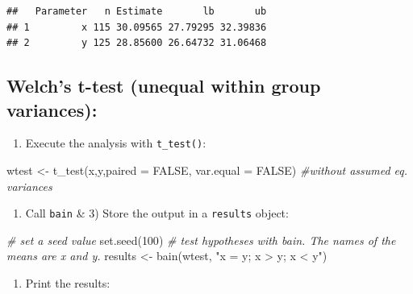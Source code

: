 \documentclass[
]{book}
\newenvironment{Shaded}{\begin{snugshade}}{\end{snugshade}}
\newcommand{\AttributeTok}[1]{\textcolor[rgb]{0.77,0.63,0.00}{#1}}
\newcommand{\CommentTok}[1]{\textcolor[rgb]{0.56,0.35,0.01}{\textit{#1}}}
\newcommand{\ConstantTok}[1]{\textcolor[rgb]{0.00,0.00,0.00}{#1}}
\newcommand{\DecValTok}[1]{\textcolor[rgb]{0.00,0.00,0.81}{#1}}
\newcommand{\FunctionTok}[1]{\textcolor[rgb]{0.00,0.00,0.00}{#1}}
\newcommand{\NormalTok}[1]{#1}
\newcommand{\OtherTok}[1]{\textcolor[rgb]{0.56,0.35,0.01}{#1}}
\newcommand{\StringTok}[1]{\textcolor[rgb]{0.31,0.60,0.02}{#1}}
\providecommand{\tightlist}{%
  \setlength{\itemsep}{0pt}\setlength{\parskip}{0pt}}
\begin{document}
\begin{verbatim}
##   Parameter   n Estimate       lb       ub
## 1         x 115 30.09565 27.79295 32.39836
## 2         y 125 28.85600 26.64732 31.06468
\end{verbatim}

\hypertarget{welchs-t-test-unequal-within-group-variances}{%
\subsection{Welch's t-test (unequal within group variances):}\label{welchs-t-test-unequal-within-group-variances}}

\begin{enumerate}
\def\labelenumi{\arabic{enumi})}
\tightlist
\item
  Execute the analysis with \texttt{t\_test()}:
\end{enumerate}

\begin{Shaded}
\begin{Highlighting}[]
\NormalTok{wtest }\OtherTok{\textless{}{-}} \FunctionTok{t\_test}\NormalTok{(x,y,}\AttributeTok{paired =} \ConstantTok{FALSE}\NormalTok{, }\AttributeTok{var.equal =} \ConstantTok{FALSE}\NormalTok{) }\CommentTok{\#without assumed eq. variances}
\end{Highlighting}
\end{Shaded}

\begin{enumerate}
\def\labelenumi{\arabic{enumi})}
\setcounter{enumi}{1}
\tightlist
\item
  Call \texttt{bain} \& 3) Store the output in a \texttt{results} object:
\end{enumerate}

\begin{Shaded}
\begin{Highlighting}[]
\CommentTok{\# set a seed value}
\FunctionTok{set.seed}\NormalTok{(}\DecValTok{100}\NormalTok{)}
\CommentTok{\# test hypotheses with bain. The names of the means are x and y.}
\NormalTok{results }\OtherTok{\textless{}{-}} \FunctionTok{bain}\NormalTok{(wtest, }\StringTok{"x = y; x \textgreater{} y; x \textless{} y"}\NormalTok{)}
\end{Highlighting}
\end{Shaded}

\begin{enumerate}
\def\labelenumi{\arabic{enumi})}
\setcounter{enumi}{2}
\tightlist
\item
  Print the results:
\end{enumerate}
\end{document}
